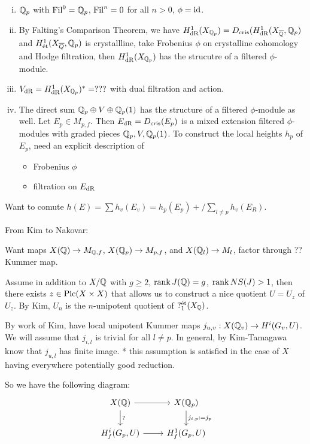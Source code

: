\begin{ex} \hfill\par
\begin{enumerate}[(i)]
\item $\mathbb{Q}_p$ with $\operatorname{Fil}^0= \mathbb{Q}_p$, $\operatorname{Fil}^n=0$ for all $n>0$, $\phi= \operatorname{id}$. 
\item By Falting's Comparison Theorem, we have $H^1_{\text{dR}}(X_{\mathbb{Q}_p})= D_{\text{cris}}(H^1_{\text{dR}}(X_{\overline{\mathbb{Q}}}, \mathbb{Q}_p)$ and $H^1_{\text{\'et}}(X_{\overline{Q}},\mathbb{Q}_p)$ is crystallline, take Frobenius $\phi$ on crystalline cohomology and Hodge filtration, then $H^1_{\text{dR}}(X_{\mathbb{Q}_p})$ has the strucutre of a filtered $\phi$-module.

\item $V_{\text{dR}}= H^1_{\text{dR}}(X_{\mathbb{Q}_p})^*= ???$ with dual filtration and action.

\item The direct sum $\mathbb{Q}_p \oplus V \oplus \mathbb{Q}_p(1)$ has the structure of a filtered $\phi$-module as well. Let $E_p \in M_{p,f}$. Then $E_{\text{dR}}= D_{\text{cris}}(E_p)$ is a mixed extension filtered $\phi$-modules with graded pieces $\mathbb{Q}_p, V, \mathbb{Q}_p(1)$. To construct the local heights $h_p$ of $E_p$, need an explicit description of

\begin{itemize}
\item Frobenius $\phi$
\item filtration on $E_{\text{dR}}$
\end{itemize}
\end{enumerate}
\end{ex}


Want to comute $h(E)= \sum h_v(E_v)= h_p(E_p) + \slash{\sum_{l \neq p} h_v(E_R)}$.


From Kim to Nakovar:

Want maps $X(\mathbb{Q}) \to M_{\mathbb{Q},f}$, $X(\mathbb{Q}_p) \to M_{p,f}$, and $X(\mathbb{Q}_l) \to M_l$, factor through ?? Kummer map. 


Assume in addition to $X/\mathbb{Q}$ with $g \geq 2$, $\operatorname{rank} J(\mathbb{Q})= g$, $\operatorname{rank} NS(J) > 1$, then there exists $z \in \operatorname{Pic}(X \times X)$ that allows us to construct a nice quotient $U= U_z$ of $U_z$. By Kim, $U_n$ is the $n$-unipotent quotient of $?_1^{\text{\'et}}(X_{\mathbb{Q}})$.

By work of Kim, have local unipotent Kummer maps $j_{u,v}: X(\mathbb{Q}_v) \to H^i(G_v,U)$. We will assume that $j_{i,l}$ is trivial for all $l \neq p$. In general, by Kim-Tamagawa know that $j_{u,l}$ has finite image. * this assumption is satisfied in the case of $X$ having everywhere potentially good reduction. 


So we have the following diagram:
	\[
	\begin{tikzcd}
	X(\Q) \arrow{d}{?} \arrow{r} & X(\Qp) \arrow{d}{j_{i,p}:= j_p} \\
	H_f^i (G_p,U) \arrow{r} & H_f^1(G_p,U)
	\end{tikzcd}
	\]


